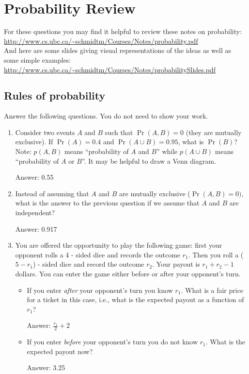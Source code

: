 \documentclass{article}
\def\ans#1{\par\gre{Answer: #1}}
\def\blu#1{{\color{blu}#1}}
\def\gre#1{{\color{gre}#1}}
\begin{document}
\clearpage

\section{Probability Review}

For these questions you may find it helpful to review these notes on probability:\\
\url{http://www.cs.ubc.ca/~schmidtm/Courses/Notes/probability.pdf}\\
And here are some slides giving visual representations of the ideas as well as some simple examples:\\
\url{http://www.cs.ubc.ca/~schmidtm/Courses/Notes/probabilitySlides.pdf}

\subsection{Rules of probability}

\blu{Answer the following questions.} You do not need to show your work.

\begin{enumerate}
\item Consider two events $A$ and $B$ such that $\Pr(A, B)=0$ (they are mutually exclusive). If $\Pr(A) = 0.4$ and $\Pr(A \cup B) = 0.95$, what is $\Pr(B)$? Note: $p(A, B)$ means
``probability of $A$ and $B$'' while $p(A \cup B)$ means ``probability of $A$ or $B$''. It may be helpful to draw a Venn diagram.
\ans{0.55}
\item Instead of assuming that $A$ and $B$ are mutually exclusive ($\Pr(A,B) = 0)$, what is the answer to the previous question if we assume that $A$ and $B$ are independent?
\ans{0.917}
\item You are offered the opportunity to play the following game: first your opponent rolls a 4\! -\! sided dice and records the outcome $r_1$. Then you roll a ($5-r_1$)\! -\! sided dice and record the outcome $r_2$. Your payout is $r_1+r_2-1$ dollars. You can enter the game either before or after your opponent's turn.
\begin{itemize}
  \item If you enter \emph{after} your opponent's turn you know $r_1$. What is a fair price for a ticket in this case, i.e., what is the expected payout as a function of $r_1$?
  \ans{$\frac{r_1}{2}+2$}
  \item If you enter \emph{before} your opponent's turn you do not know $r_1$. What is the expected payout now?
  \ans{3.25}
\end{itemize}
\end{enumerate}
\end{document}
